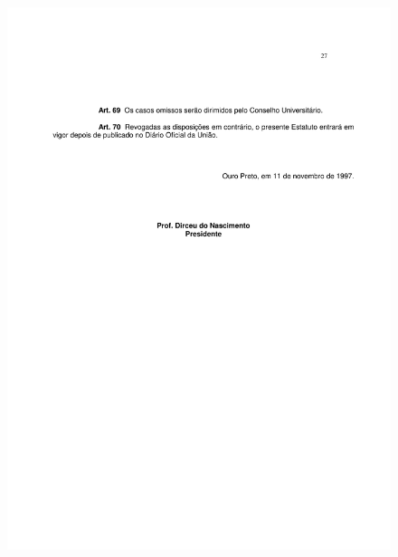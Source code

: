 \begin{figure}[p]
	\centering 
	\includegraphics[scale=0.7]{capitulos/resolucoes/cuni414/cuni414-27.pdf}
\end{figure} \pagebreak

